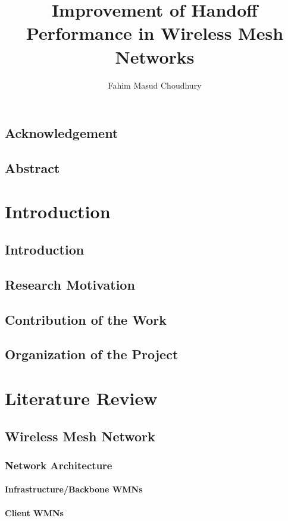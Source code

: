 \documentclass[11pt,a4paper]{report}
\author{Fahim Masud Choudhury}
\title{Improvement of Handoff Performance in Wireless Mesh Networks}
\begin{document}
\maketitle
\tableofcontents
\newpage
\section*{Acknowledgement}
\newpage
\section*{Abstract}

\chapter{Introduction}
\section{Introduction}
\section{Research Motivation}
\section{Contribution of the Work}
\section{Organization of the Project}

\chapter{Literature Review}

\section{Wireless Mesh Network}
\subsection{Network Architecture}
\subsubsection{Infrastructure/Backbone WMNs}
\subsubsection{Client WMNs}
\end{document}
